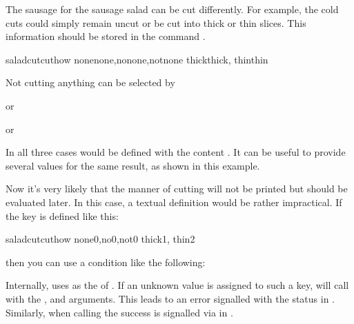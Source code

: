\begin{Example}
  The sausage for the sausage salad can be cut differently. For example, the
  cold cuts could simply remain uncut or be cut into thick or thin slices.
  This information should be stored in the command .
\begin{lstcode}
                     {saladcut}{cuthow}{%
                       {none}{none},{no}{none},{not}{none}%
                       {thick}{thick},%
                       {thin}{thin}%
                     }
\end{lstcode}
  Not cutting anything can be selected by
\begin{lstcode}
\end{lstcode}
  or
\begin{lstcode}
\end{lstcode}
  or
\begin{lstcode}
\end{lstcode}
  In all three cases  would be defined with the content
  . It can be useful to provide several values for the same
  result, as shown in this example.

  Now it's very likely that the manner of cutting will not be printed but
  should be evaluated later. In this case, a textual definition would be
  rather impractical. If the key is defined like this:
\begin{lstcode}
                     {saladcut}{cuthow}{%
                       {none}{0},{no}{0},{not}{0}%
                       {thick}{1},%
                       {thin}{2}%
                     }
\end{lstcode}
  then you can use a condition like the following:
\begin{lstcode}
  \ifcase\cuthow
  \or
  \else
  \fi
\end{lstcode}
\end{Example}
Internally,  uses  as the
 of . If an unknown
value is assigned to such a key,  will call
 with the ,
 and  arguments. This leads to an error signalled with
the  status in
. Similarly, when calling
 the success is signalled via
 in
.%
%
\EndIndexGroup


